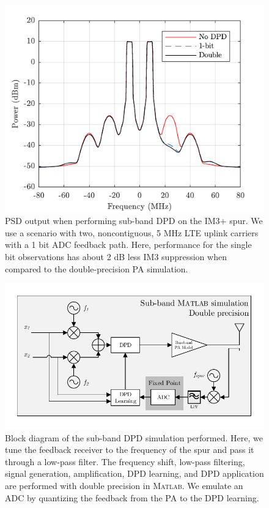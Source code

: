 \documentclass[conference]{IEEEtran}
\begin{document}
\begin{figure}[]
	\centering
	\includegraphics[]{SubBandPSD}
	\caption{PSD output when performing sub-band DPD on the IM3+ spur. We use a scenario with two, noncontiguous, 5 MHz LTE uplink carriers with a 1 bit ADC feedback path. Here, performance for the single bit observations has about 2 dB less IM3 suppression when compared to the double-precision PA simulation. }
	\label{subbandpsd}
\end{figure}

\begin{figure}[]
	\centering
	\includegraphics[width=\columnwidth]{SubBand}
	\caption{Block diagram of the sub-band DPD simulation performed. Here, we tune the feedback receiver to the frequency of the spur and pass it through a low-pass filter. The frequency shift, low-pass filtering, signal generation, amplification, DPD learning, and DPD application are performed with double precision in \textsc{Matlab}. We emulate an ADC by quantizing the feedback from the PA to the DPD learning.}
	\label{block2}
\end{figure}
\end{document}
